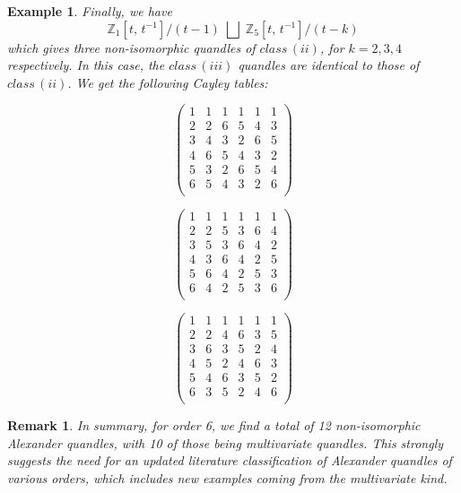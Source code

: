 \documentclass[a4paper,12pt]{article}
\newtheorem{remark}{Remark}[section]
\newtheorem{example}{Example}[section]
\begin{document}
\begin{example}
Finally, we have 
$$\mathbb{Z}_1  [t, \, t^{-1}]   / (t-1) \; \bigsqcup  \; \mathbb{Z}_5  [t, \, t^{-1}]   / (t - k)$$  
which gives three non-isomorphic quandles of $class \, (ii)$, for $k = 2, 3, 4$ respectively. In this case, the $class \, (iii)$ quandles are identical to those of $class \, (ii)$. We get the following Cayley tables:  

$$  \left(
\begin{array}{cccccc}
 1 & 1 & 1 & 1 & 1 & 1 \\
 2 & 2 & 6 & 5 & 4 & 3 \\
 3 & 4 & 3 & 2 & 6 & 5 \\
 4 & 6 & 5 & 4 & 3 & 2 \\
 5 & 3 & 2 & 6 & 5 & 4 \\
 6 & 5 & 4 & 3 & 2 & 6 \\
\end{array}
\right)   $$

$$  \left(
\begin{array}{cccccc}
 1 & 1 & 1 & 1 & 1 & 1 \\
 2 & 2 & 5 & 3 & 6 & 4 \\
 3 & 5 & 3 & 6 & 4 & 2 \\
 4 & 3 & 6 & 4 & 2 & 5 \\
 5 & 6 & 4 & 2 & 5 & 3 \\
 6 & 4 & 2 & 5 & 3 & 6 \\
\end{array}
\right)   $$  

$$  \left(
\begin{array}{cccccc}
 1 & 1 & 1 & 1 & 1 & 1 \\
 2 & 2 & 4 & 6 & 3 & 5 \\
 3 & 6 & 3 & 5 & 2 & 4 \\
 4 & 5 & 2 & 4 & 6 & 3 \\
 5 & 4 & 6 & 3 & 5 & 2 \\
 6 & 3 & 5 & 2 & 4 & 6 \\
\end{array}
\right)   $$ 

\end{example}

\begin{remark} 
In summary, for order 6, we find a total of 12 non-isomorphic Alexander quandles, with 10 of those being multivariate quandles. This strongly suggests the need for an updated literature classification of Alexander quandles of various orders, which includes new examples coming from the multivariate kind.     
\end{remark} 
\end{document}
